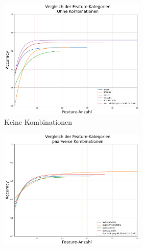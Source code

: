 \begin{figure}[htb]
     \centering
     \begin{subfigure}[b]{\textwidth}
         \begin{subfigure}[b]{0.49\textwidth}
             \centering
             \includegraphics[width=\textwidth]{img/Plots/Feature Auswahl/Trendlinien Feature-Kategorien 0Up- Accuracy Plot.png}
             \caption{Keine Kombinationen}
         \end{subfigure}
         \hfill
         \begin{subfigure}[b]{0.49\textwidth}
             \centering
             \includegraphics[width=\textwidth]{img/Plots/Feature Auswahl/Trendlinien Feature-Kategorien 1Up - Accuracy Plot.png}

\end{subfigure}
\end{subfigure}
\end{figure}
